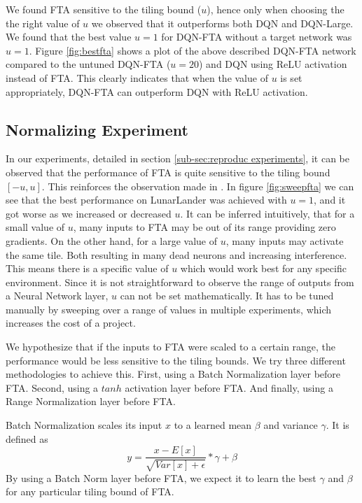 \documentclass{article}
\begin{document}
We found FTA sensitive to the tiling bound ($u$), hence only when choosing the the right value of $u$ we observed that it outperforms both DQN and DQN-Large.
We found that the best value $u=1$ for DQN-FTA without a target network was $u=1$.
Figure \ref{fig:bestfta} shows a plot of the above described DQN-FTA network compared to the untuned DQN-FTA ($u=20$) and DQN using ReLU activation instead of FTA.
This clearly indicates that when the value of $u$ is set appropriately, DQN-FTA can outperform DQN with ReLU activation.


\subsection{Normalizing Experiment} \label{sub-sec:normalize experiments}
In our experiments, detailed in section \ref{sub-sec:reproduc experiments}, it can be observed that the performance of FTA is quite sensitive to the tiling bound $[-u, u]$.
This reinforces the observation made in \cite{pan2019fuzzy}.
In figure \ref{fig:sweepfta} we can see that the best performance on LunarLander was achieved with $u=1$, and it got worse as we increased or decreased $u$.
It can be inferred intuitively, that for a small value of $u$, many inputs to FTA may be out of its range providing zero gradients.
On the other hand, for a large value of $u$, many inputs may activate the same tile.
Both resulting in many dead neurons and increasing interference.
This means there is a specific value of $u$ which would work best for any specific environment.
Since it is not straightforward to observe the range of outputs from a Neural Network layer, $u$ can not be set mathematically.
It has to be tuned manually by sweeping over a range of values in multiple experiments, which increases the cost of a project.

We hypothesize that if the inputs to FTA were scaled to a certain range, the performance would be less sensitive to the tiling bounds.
We try three different methodologies to achieve this.
First, using a Batch Normalization \cite[]{ioffe2015batch} layer before FTA.
Second, using a $tanh$ activation layer before FTA.
And finally, using a Range Normalization layer before FTA.

Batch Normalization scales its input $x$ to a learned mean $\beta$ and variance $\gamma$.
It is defined as
\begin{equation}
    y = \frac{x-E[x]}{\sqrt{Var[x] + \epsilon}} * \gamma + \beta
    \label{eq:batchnorm}
\end{equation}
By using a Batch Norm layer before FTA, we expect it to learn the best $\gamma$ and $\beta$ for any particular tiling bound of FTA.
\end{document}
